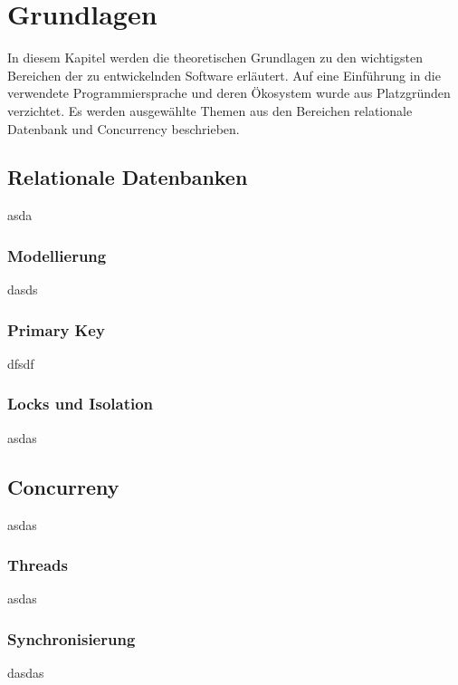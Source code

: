 \chapter{Grundlagen}\label{chap:Grundlagen}
\chapterstart
In diesem Kapitel werden die theoretischen Grundlagen zu den wichtigsten Bereichen der zu entwickelnden Software erläutert. Auf eine Einführung in die verwendete Programmiersprache und deren Ökosystem wurde aus Platzgründen verzichtet. Es werden ausgewählte Themen aus den Bereichen relationale Datenbank und Concurrency beschrieben.

\section{Relationale Datenbanken}
asda
\subsection{Modellierung}
dasds
\subsection{Primary Key}
dfsdf
\subsection{Locks und Isolation}
asdas
\section{Concurreny}
asdas
\subsection{Threads}
asdas
\subsection{Synchronisierung}
dasdas
\chapterend
